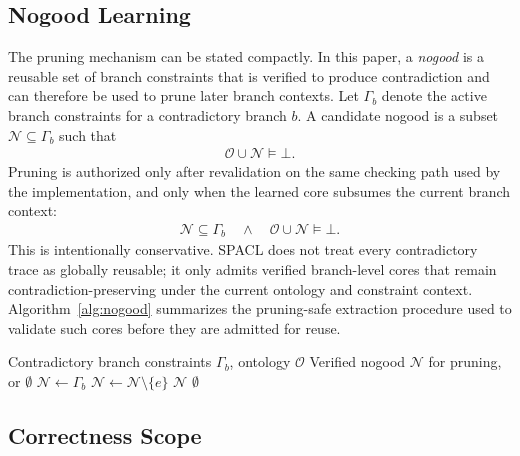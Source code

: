 \documentclass[preprint,12pt,times]{elsarticle}
\begin{document}
\subsection{Nogood Learning}
\label{sec:nogood-formal}

The pruning mechanism can be stated compactly. In this paper, a \emph{nogood} is a reusable set of branch constraints that is verified to produce contradiction and can therefore be used to prune later branch contexts. Let $\Gamma_b$ denote the active branch constraints for a contradictory branch $b$. A candidate nogood is a subset $\mathcal{N} \subseteq \Gamma_b$ such that
\begin{align}
\mathcal{O} \cup \mathcal{N} \models \bot.
\end{align}
Pruning is authorized only after revalidation on the same checking path used by the implementation, and only when the learned core subsumes the current branch context:
\begin{align}
\mathcal{N} \subseteq \Gamma_b \quad \land \quad \mathcal{O} \cup \mathcal{N} \models \bot.
\end{align}
This is intentionally conservative. SPACL does not treat every contradictory trace as globally reusable; it only admits verified branch-level cores that remain contradiction-preserving under the current ontology and constraint context. Algorithm~\ref{alg:nogood} summarizes the pruning-safe extraction procedure used to validate such cores before they are admitted for reuse.

\begin{algorithm}[htbp]
\caption{Verified Nogood Extraction (Pruning-Safe)}
\label{alg:nogood}
\begin{algorithmic}[1]
\Require Contradictory branch constraints $\Gamma_b$, ontology $\mathcal{O}$
\Ensure Verified nogood $\mathcal{N}$ for pruning, or $\emptyset$
\State $\mathcal{N} \gets \Gamma_b$
        \State $\mathcal{N} \gets \mathcal{N}\setminus\{e\}$
    \EndIf
\EndFor
{}
    \State \Return $\mathcal{N}$
\Else
    \State \Return $\emptyset$
\EndIf
\end{algorithmic}
\end{algorithm}

\subsection{Correctness Scope}
\label{sec:correctness}
\end{document}
